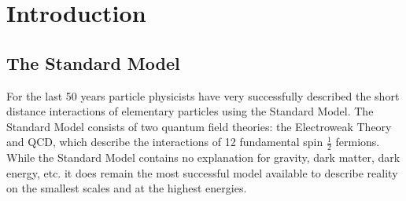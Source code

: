 \chapter{Introduction}

\section{The Standard Model}
\label{SM}
For the last 50 years particle physicists have very successfully described the short distance interactions of elementary particles using the Standard Model.  
The Standard Model consists of two quantum field theories: the Electroweak Theory and \gls{QCD}, which describe the interactions of 12 fundamental spin $\frac{1}{2}$ fermions.  
While the Standard Model contains no explanation for gravity, dark matter, dark energy, etc. it does remain the most successful model available to describe reality on the smallest scales and at the highest energies.  

